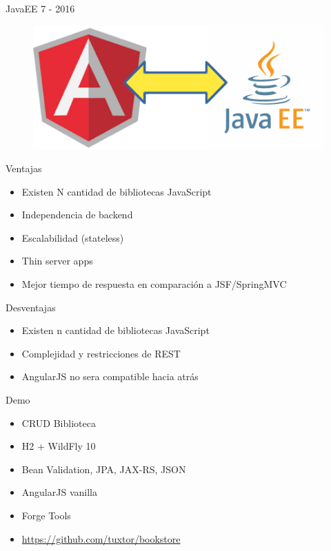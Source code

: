 \documentclass{beamer}
\begin{document}
\begin{frame}{JavaEE 7 - 2016}
	\begin{figure}
		\centering
		\includegraphics[width=0.8\linewidth]{Images/anguaree.png}
	\end{figure}
\end{frame}


\begin{frame}{Ventajas}
	\begin{itemize}
		\item Existen N cantidad de bibliotecas JavaScript
		\item Independencia de backend
		\item Escalabilidad (stateless)
		\item Thin server apps
		\item Mejor tiempo de respuesta en comparación a JSF/SpringMVC
	\end{itemize}
\end{frame}

\begin{frame}{Desventajas}
	\begin{itemize}
		\item Existen n cantidad de bibliotecas JavaScript
		\item Complejidad y restricciones de REST
		\item AngularJS no sera compatible hacia atrás
	\end{itemize}
\end{frame}

\begin{frame}{Demo}
	\begin{itemize}
		\item CRUD Biblioteca
		\item H2 + WildFly 10
		\item Bean Validation, JPA, JAX-RS, JSON
		\item AngularJS vanilla
		\item Forge Tools
		\item \url{https://github.com/tuxtor/bookstore}
	\end{itemize}
\end{frame}
\end{document}

